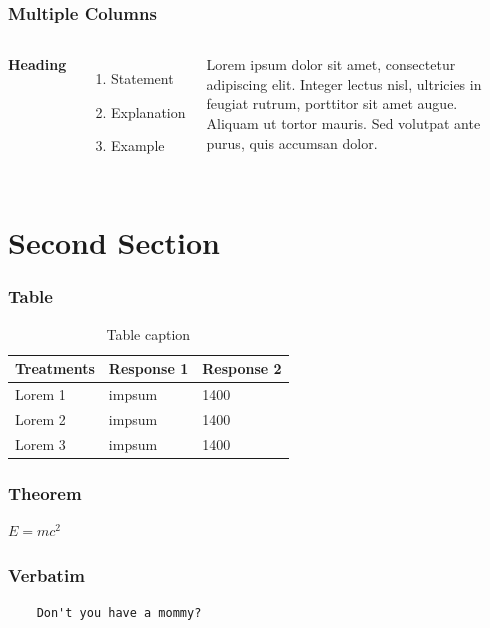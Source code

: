 \documentclass[14.5pt]{beamer}
\begin{document}

\begin{frame}
\frametitle{Multiple Columns}
\begin{columns}[c] 

\textbf{Heading}
\begin{enumerate}
\item Statement
\item Explanation
\item Example
\end{enumerate}

Lorem ipsum dolor sit amet, consectetur adipiscing elit. Integer lectus nisl, ultricies in feugiat rutrum, porttitor sit amet augue. Aliquam ut tortor mauris. Sed volutpat ante purus, quis accumsan dolor.

\end{columns}
\end{frame}

\section{Second Section}

\begin{frame}
\frametitle{Table}
\begin{table}
\begin{tabular}{l l l}
\toprule
\textbf{Treatments} & \textbf{Response 1} & \textbf{Response 2}\\
\midrule
Lorem 1 & impsum & 1400 \\
Lorem 2 & impsum & 1400 \\
Lorem 3 & impsum & 1400 \\
\bottomrule
\end{tabular}
\caption{Table caption}
\end{table}
\end{frame}


\begin{frame}
\frametitle{Theorem}
\begin{theorem}
$E = mc^2$
\end{theorem}
\end{frame}

%
\begin{frame}[fragile] %
\frametitle{Verbatim}
\begin{verbatim}
    Don't you have a mommy?
\end{verbatim}
\end{frame}
\end{document}
